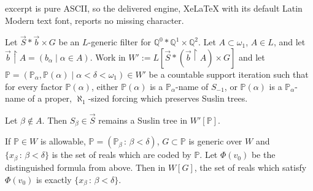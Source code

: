 \documentclass[10pt,a4paper]{amsart}
\newcommand{\forceP}{\mathbb{P}}
\newcommand{\forceQ}{\mathbb{Q}}
\begin{document}
excerpt is pure ASCII, so the delivered engine, XeLaTeX with its default Latin Modern text font, reports no missing character.
\begin{lemma}\label{PullingOutATree}
Let $\vec{S} \ast \vec{b} \times G$ be an $L$-generic filter for $\forceQ^0 \ast \forceQ^1 \times \forceQ^2$.
Let $A \subset \omega_1$, $A \in L$, and let $\vec{b} \upharpoonright A = (b_{\alpha} \mid \alpha \in A)$.
Work in $W':=L[\vec{S} \ast (\vec{b} \upharpoonright A) \times G]$ and let $\forceP = (\forceP_{\alpha}, \forceP(\alpha) \mid \alpha < \delta < \omega_1) \in W' $ be 
a countable support iteration such that for every factor $\forceP(\alpha)$, either $\forceP(\alpha)$ is a $\forceP_{\alpha}$-name of $S_{-1}$, or $\forceP(\alpha)$ is a $\forceP_{\alpha}$-name of a proper, $\aleph_1$-sized forcing which preserves Suslin trees.

Let $\beta \notin A$. Then $S_{\beta} \in \vec{S}$ remains a Suslin tree in $W' [\forceP]$.
\end{lemma}

\begin{lemma}\label{nounwantedcodes}
If $\forceP \in W$ is allowable, $\forceP=(\forceP_{\beta} \, : \, \beta < \delta)$, $G \subset \forceP$ is generic over $W$ and $\{ x_{\beta} \, : \, \beta < \delta\}$ is the set of reals which are coded by $\forceP$. Let $\Phi(v_0)$ be the distinguished formula from above. Then
in $W[G]$, the set of reals which satisfy $\Phi(v_0)$ is exactly 
$\{ x_{\beta} \, : \, \beta < \delta\}$.
\end{lemma}
\end{document}
